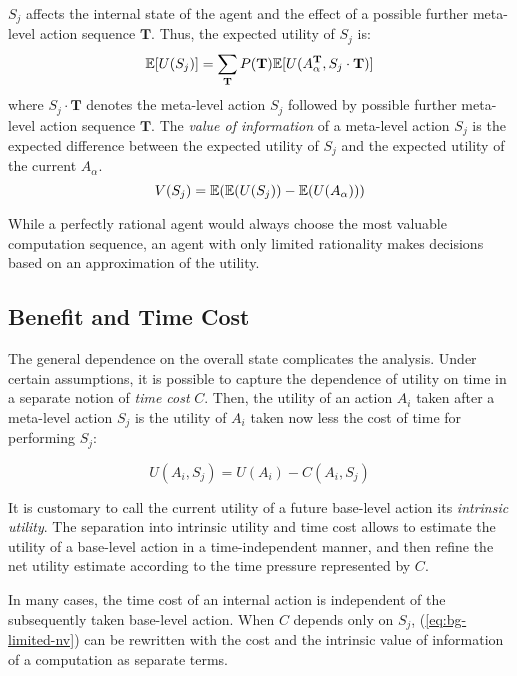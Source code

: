 $S_j$ affects the internal state of the agent and the effect of
a possible further meta-level action sequence $\mathbf{T}$. Thus, the expected utility of
$S_j$ is:
\begin{equation}
\label{eq:bg-limited-su}
\mathbb{E}[U(S_j)]=\sum_{\mathbf{T}}P(\mathbf{T})\mathbb{E}[U(A_{\alpha}^\mathbf{T},S_j\cdot\mathbf{T})]
\end{equation}
where $S_j\cdot\mathbf{T}$ denotes the meta-level action $S_j$
followed by possible further meta-level action sequence $\mathbf{T}$.
The {\em value of information} of a meta-level action $S_j$ is
the expected difference between the expected utility of $S_j$ and the
expected utility of the current $A_\alpha$.
\begin{equation}
\label{eq:bg-limited-nv}
V(S_j)=\mathbb{E}(\mathbb{E}(U(S_j))-\mathbb{E}(U(A_\alpha)))
\end{equation}

While a perfectly rational agent would always choose the most valuable
computation sequence, an agent with only limited rationality makes
decisions based on an approximation of the utility.

\subsection{Benefit and Time Cost}
\label{sec:ratimeta-benefit-timecost}

The general dependence on the overall state complicates the analysis. Under
certain assumptions, it is possible to capture the dependence of utility on time in a
separate notion of {\em time cost} $C$. Then, the utility of an action $A_i$ taken
 after a meta-level action $S_j$ is the utility of $A_i$ taken now less the
cost of time for performing $S_j$:

\begin{equation}
\label{eq:bg-limited-iu}
U(A_i, S_j) = U(A_i) - C(A_i, S_j)
\end{equation}

It is customary to call the current utility of a future base-level
action its {\em intrinsic utility}. The separation into intrinsic
utility and time cost allows to estimate the utility of a base-level
action in a time-independent manner, and then refine the net utility
estimate according to the time pressure represented by $C$.

In many cases, the time cost of an internal action is independent of
the subsequently taken base-level action. When $C$ depends only on
$S_j$, (\ref{eq:bg-limited-nv}) can be rewritten with the cost and the
intrinsic value of information of a computation as separate terms.

